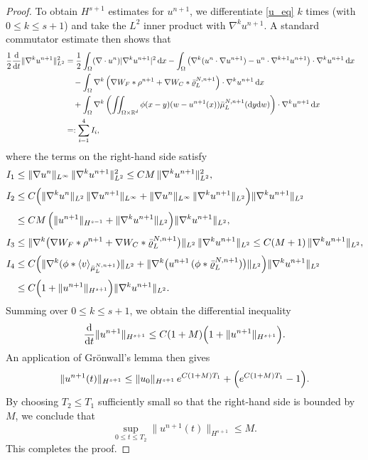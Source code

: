 \documentclass[10pt, reqno]{amsart}
\theoremstyle{definition}
\theoremstyle{remark}
\numberwithin{equation}{section}
\newcommand{\dx}{\textnormal{d}x}
\newcommand{\dy}{\textnormal{d}y}
\newcommand{\dw}{\textnormal{d}w}
\newcommand{\ddt}{\frac{\textnormal{d}}{\textnormal{d}t}}
\newcommand{\R}{\mathbb{R}}
\begin{document}
\begin{proof}
To obtain $H^{s+1}$ estimates for $u^{n+1}$, we differentiate \eqref{u_eq} $k$ times (with $0\le k\le s+1$) and take the $L^2$ inner product with $\nabla^k u^{n+1}$. A standard commutator estimate then shows that
$$\begin{aligned}
 \frac12\ddt\|\nabla^k u^{n+1}\|_{L^2}^2  
&  = \frac12\int_{\Omega} (\nabla \cdot  u^n)|\nabla^k u^{n+1}|^2\,\dx - \int_\Omega \left(\nabla^k ( u^n \cdot \nabla u^{n+1}) - u^n \cdot \nabla^{k+1} u^{n+1}\right) \cdot \nabla^k u^{n+1}\,\dx\cr
&\quad - \int_\Omega \nabla^k \left(\nabla W_F * \rho^{n+1}  + \nabla W_C *  \bar\varrho_L^{N, n+1} \right)\cdot\nabla^k u^{n+1}\,\dx\cr
&\quad + \int_\Omega \nabla^k \left(\iint_{\Omega \times \R^d} \phi(x-y) (w-u^{n+1}(x)) \bar\mu_L^{N, n+1}(\dy\dw) \right) \cdot \nabla^k u^{n+1}\,\dx\cr
& =: \sum_{i=1}^4 I_i,
\end{aligned}$$
where the terms on the right-hand side satisfy
\begin{align*}
I_1 &\le \|\nabla u^n\|_{L^\infty}\,\|\nabla^k u^{n+1}\|_{L^2}^2 \le C M\, \|\nabla^k u^{n+1}\|_{L^2}^2,\\[1mm]
I_2 &\le C\Bigl(\|\nabla^k u^n\|_{L^2}\,\|\nabla u^{n+1}\|_{L^\infty} + \|\nabla u^n\|_{L^\infty}\,\|\nabla^k u^{n+1}\|_{L^2}\Bigr)\|\nabla^k u^{n+1}\|_{L^2}\\[1mm]
&\le C M\, \Bigl(\|u^{n+1}\|_{H^{s-1}} + \|\nabla^k u^{n+1}\|_{L^2}\Bigr)\|\nabla^k u^{n+1}\|_{L^2},\\[1mm]
I_3 &\le \|\nabla^k \bigl(\nabla W_F * \rho^{n+1} + \nabla W_C * \bar\varrho_L^{N, n+1}\bigr)\|_{L^2}\,\|\nabla^k u^{n+1}\|_{L^2} \le C(M+1)\,\|\nabla^k u^{n+1}\|_{L^2},\\[1mm]
I_4 &\le C\Bigl(\|\nabla^k (\phi *  \langle v \rangle_{\bar\mu^{N, n+1}_L})\|_{L^2} + \|\nabla^k\bigl(u^{n+1}\, (\phi *   \bar\varrho^{N, n+1}_L)\bigr)\|_{L^2}\Bigr)\|\nabla^k u^{n+1}\|_{L^2}\\[1mm]
&\le C\Bigl(1 + \|u^{n+1}\|_{H^{s+1}}\Bigr)\|\nabla^k u^{n+1}\|_{L^2}.
\end{align*}
Summing over $0\le k\le s+1$, we obtain the differential inequality
\[
\ddt\|u^{n+1}\|_{H^{s+1}} \le C(1+M) \Bigl(1+\|u^{n+1}\|_{H^{s+1}}\Bigr).
\]
An application of Gr\"onwall's lemma then gives
\[
\|u^{n+1}(t)\|_{H^{s+1}} \le \|u_0\|_{H^{s+1}}\, e^{C(1+M)T_1} + \Bigl(e^{C(1+M)T_1}-1\Bigr).
\]
By choosing $T_2 \le T_1$ sufficiently small so that the right-hand side is bounded by $M$, we conclude that
\[
\sup_{0\le t\le T_2} \|u^{n+1}(t)\|_{H^{s+1}} \le M.
\]
This completes the proof.
\end{proof}
\end{document}
